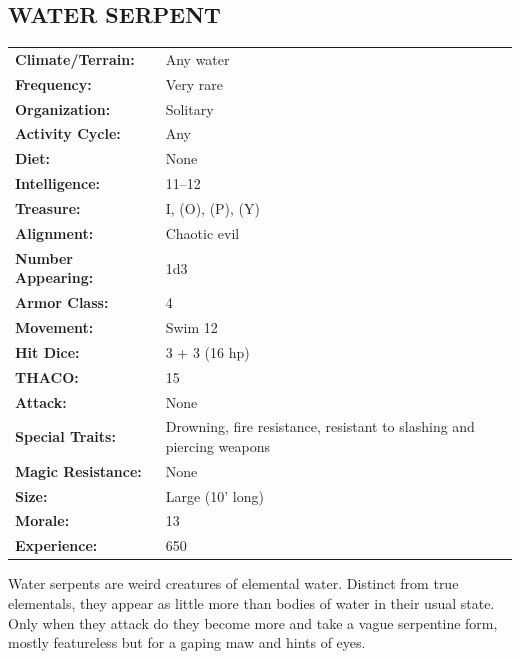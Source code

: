 \begin{multicols}{2}
\noindent
\begin{minipage}{\columnwidth}

\vspace{1em}

\subsection{WATER SERPENT}

\noindent \begin{tabular}{p{}p{}}
\textbf{Climate/Terrain:}	& Any water	\\
\textbf{Frequency:} 		& Very rare	\\
\textbf{Organization:} 		& Solitary	\\
\textbf{Activity Cycle:} 	& Any	\\
\textbf{Diet:} 				& None	\\
\textbf{Intelligence:} 		& 11--12	\\
\textbf{Treasure:} 			& I, (O), (P), (Y)	\\
\textbf{Alignment:} 		& Chaotic evil	\\
\hline
\textbf{Number Appearing:} 	& 1d3	\\
\textbf{Armor Class:} 		& 4	\\
\textbf{Movement:} 			& Swim 12	\\
\textbf{Hit Dice:} 			& 3 + 3 (16 hp)	\\
\textbf{THACO:} 			& 15	\\
\textbf{Attack:} 			& None	\\
\textbf{Special Traits:} & Drowning, fire resistance, resistant to slashing and piercing weapons	\\
\textbf{Magic Resistance:} 	& None	\\
\textbf{Size:} 				& Large (10' long)	\\
\textbf{Morale:} 			& 13	\\
\textbf{Experience:} 		& 650	\\ %
\end{tabular}

\end{minipage}

Water serpents are weird creatures of elemental water. Distinct from true elementals, they appear as little more than bodies of water in their usual state. Only when they attack do they become more and take a vague serpentine form, mostly featureless but for a gaping maw and hints of eyes.


\end{multicols}
